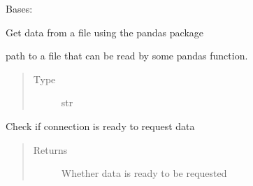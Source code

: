 \documentclass[letterpaper,10pt,english]{sphinxmanual}
\begin{document}
\begin{fulllineitems}
\label{\detokenize{dalio.external:dalio.external.file.PandasInFile}}
Bases: {\hyperref[\detokenize{dalio.external:dalio.external.external.External}]{}}

Get data from a file using the pandas package

\begin{fulllineitems}
\label{\detokenize{dalio.external:dalio.external.file.PandasInFile._connection}}
path to a file that can be read by some pandas
function.
\begin{quote}\begin{description}
\item[{Type}] \leavevmode
str

\end{description}\end{quote}

\end{fulllineitems}


\begin{fulllineitems}
\label{\detokenize{dalio.external:dalio.external.file.PandasInFile.check}}
Check if connection is ready to request data
\begin{quote}\begin{description}
\item[{Returns}] \leavevmode
Whether data is ready to be requested

\end{description}\end{quote}

\end{fulllineitems}



\end{fulllineitems}
\end{document}
